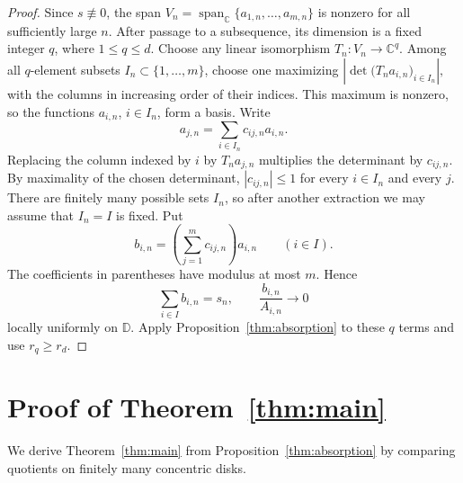 \documentclass[12pt,letterpaper,reqno]{amsart}
\theoremstyle{definition}
\numberwithin{equation}{section}
\newcommand{\D}{\mathbb D}
\newcommand{\C}{\mathbb C}
\begin{document}
\begin{proof}
    Since $s\not\equiv0$, the span
    $V_n=\operatorname{span}_{\C}\{a_{1,n},\ldots,a_{m,n}\}$ is nonzero
    for all sufficiently large $n$. After passage to a subsequence,
    its dimension is a fixed integer $q$, where $1\le q\le d$.
    Choose any linear isomorphism $T_n:V_n\to\C^q$.
    Among all $q$-element subsets $I_n\subset\{1,\ldots,m\}$, choose
    one maximizing
$
\left|\det\bigl(T_n a_{i,n}\bigr)_{i\in I_n}\right|,
$
    with the columns in increasing order of their indices. This maximum
    is nonzero, so the functions $a_{i,n}$, $i\in I_n$, form a basis.
    Write
    \[
        a_{j,n}=\sum_{i\in I_n}c_{ij,n}a_{i,n}.
    \]
    Replacing the column indexed by $i$ by $T_n a_{j,n}$ multiplies
    the determinant by $c_{ij,n}$. By maximality of the chosen
    determinant, $|c_{ij,n}|\le1$ for every $i\in I_n$ and every $j$.
    There are finitely many possible sets $I_n$, so after another
    extraction we may assume that $I_n=I$ is fixed. Put
    \[
        b_{i,n}=\left(\sum_{j=1}^m c_{ij,n}\right)a_{i,n}
        \qquad(i\in I).
    \]
    The coefficients in parentheses have modulus at most $m$. Hence
    \[
        \sum_{i\in I}b_{i,n}=s_n,\qquad
        \frac{b_{i,n}}{A_{i,n}}\longrightarrow0
    \]
    locally uniformly on $\D$. Apply Proposition~\ref{thm:absorption}
    to these $q$ terms and use $r_q\ge r_d$.
\end{proof}
	
	\section{Proof of Theorem~\ref{thm:main}}\label{sec:partition}
	
We derive Theorem~\ref{thm:main} from Proposition~\ref{thm:absorption}
by comparing quotients on finitely many concentric disks.
\end{document}
